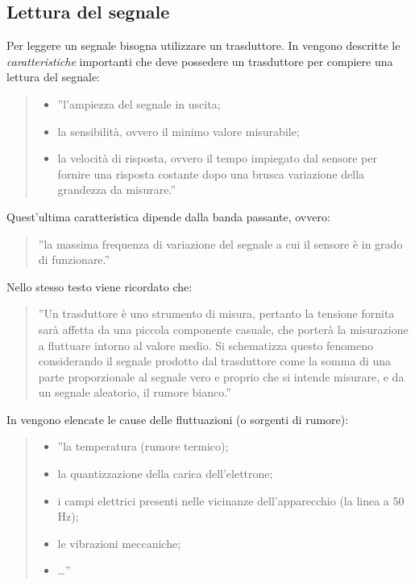 \documentclass[a4paper]{report} %
\begin{document}
\subsection{Lettura del segnale}
Per leggere un segnale bisogna utilizzare un trasduttore. In \cite{art:rif.2} vengono descritte le \textit{caratteristiche} importanti che deve possedere un trasduttore per compiere una lettura del segnale: 
\begin{quote}
	\begin{itemize}
		\item ''l'ampiezza del segnale in uscita;
		\item la sensibilità, ovvero il minimo valore misurabile;
		\item la velocità di risposta, ovvero il tempo impiegato dal sensore per fornire una risposta costante dopo una brusca variazione della grandezza da misurare.''
	\end{itemize}
\end{quote}
Quest'ultima caratteristica dipende dalla banda passante, ovvero:
\begin{quote}
	''la massima frequenza di variazione del segnale a cui il sensore è in grado di funzionare.'' 
\end{quote}
Nello stesso testo viene ricordato che:	 
\begin{quote}
	''Un trasduttore è uno strumento di misura, pertanto la tensione fornita sarà affetta da una piccola componente casuale, che porterà la misurazione a fluttuare intorno al valore medio. Si schematizza questo fenomeno considerando il segnale prodotto dal trasduttore come la somma di una parte proporzionale al segnale vero e proprio che si intende misurare, e da un segnale aleatorio, il rumore bianco.''	
\end{quote}
In \cite{art:rif.2} vengono elencate le cause delle fluttuazioni (o sorgenti di rumore):
\begin{quote}	
	\begin{itemize}
	\item ''la temperatura (rumore termico);
	\item la quantizzazione della carica dell'elettrone;
	\item i campi elettrici presenti nelle vicinanze dell'apparecchio (la linea a 50 Hz);
	\item le vibrazioni meccaniche;
	\item \dots ''
	\end{itemize}
\end{quote}
\end{document}
